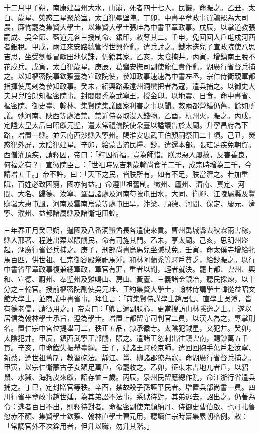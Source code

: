 \begin{pinyinscope}
 十二月甲子朔，南康建昌州大水，山崩，死者四十七人，民饑，命賑之。乙丑，太白、歲星、熒惑三星聚於室，太白犯壘壁陣。丁卯，中書平章政事買驢罷為大司農，廉恂罷為集賢大學士，以集賢大學士張珪為中書平章政事。戊辰，以掌道教張嗣成、吳全節、藍道元各三授制命、銀印，敕奪其二。壬申，免回回人戶屯戍河西者銀稅。甲戌，兩江來安路總管岑世興作亂，遣兵討之。鐵木迭兒子宣政院使八思吉思，坐受劉夔冒獻田地伏誅，仍籍其家。乙亥，太陰掩井。丙寅，增鎮南王脫不花戍兵。戊寅，太白犯歲星。庚辰，葛蠻安撫司副使龍仁貴作亂，湖廣行省督兵捕之。以知樞密院事欽察臺為宣政院使，參知政事速速為中書左丞，宗仁侍衛親軍都指揮使馬剌為參知政事。癸未，紹興路柔遠州洞蠻把者為寇，遣兵捕之。以御史大夫只兒哈郎知樞密院事。封闍闍禿為武寧王，授金印。以地震、日食，命中書省、樞密院、御史臺、翰林、集賢院集議國家利害之事以聞。敕兩都營繕仍舊，餘如所議。弛河南、陜西等處酒禁。禁近侍奏取沒入錢物。乙酉，杭州火，賑之。丙戌，定謚太皇太后曰昭獻元聖，遣太常禮儀院使朵臺以謚議告於太廟。升寧昌府為下路，增置一縣。並云南西沙縣入寧州。賜淮安忠武王伯顏祠祭田二十頃。己丑，熒惑犯外屏，太陰犯建星。辛卯，給蒙古流民糧、鈔，遣還本部。張珪足疾免朝賀。西僧灌頂疾，請釋囚，帝曰：「釋囚祈福，豈為師惜。朕思惡人屢赦，反害善良，何福之有？」宣徽院臣言：「世祖時晃吉剌歲輸尚食羊二千，成宗時增為三千，今請增五千。」帝不許，曰：「天下之民，皆朕所有，如有不足，朕當濟之。若加重賦，百姓必致困窮，國亦何益。」命遵世祖舊制。徽州、廬州、濟南、真定、河間、大名、歸德、汝寧、鞏昌諸處及河南芍陂屯田水，大同、衛輝、江陵屬縣及豐贍署大惠屯風，河南及雲南烏蒙等處屯田旱，汴梁、順德、河間、保定、慶元、濟寧、濮州、益都諸屬縣及諸衛屯田蝗。



 三年春正月癸巳朔，暹國及八番洞蠻酋長各遣使來貢。曹州禹城縣去秋霖雨害稼，縣人邢著、程進出粟以賑饑民，命有司旌其門。乙未，享太廟。己亥，思明州盜起，湖廣行省督兵捕之。庚子，刑部尚書烏馬兒坐贓杖免。壬寅，命太僕寺增給牝馬百匹，供世祖、仁宗御容殿祭祀馬湩。和林阿蘭禿等驛戶貧乏，給鈔賑之。以行中書省平章政事復兼總軍政，軍官有罪，重者以聞，輕者就決。罷上都、雲州、興和、宣德、蔚州、奉聖州及雞鳴山、房山、黃蘆、三義諸金銀冶，聽民採煉，以十分之三輸官。授前樞密院副使吳元珪、王約集賢大學士，翰林侍講學士韓從益昭文館大學士，並商議中書省事。拜住言：「前集賢侍講學士趙居信、直學士吳澄，皆有德老儒，請徵用之。」帝喜曰：「卿言適副朕心，更當搜訪山林隱逸之士。」遂以居信為翰林學士承旨，澄為學士。增置上都留守司判官二員，以漢人為之，專掌刑名。置仁宗中宮位提舉司二，秩正五品，隸承徽寺。太陰犯鉞星，又犯井。癸卯，太陰犯井。甲辰，鎮西武寧王部饑，賑之。遣諸王忽剌出往鎮雲南，賜鈔萬五千貫。辛亥，申命鐵失振舉臺綱。壬子，建諸王驛於京師，遣回回砲手萬戶赴汝寧、新蔡，遵世祖舊制，教習砲法。靜江、邕、柳諸郡獠為寇，命湖廣行省督兵捕之。甲寅，以宗仁衛蒙古子女額足萬戶，命罷收之。乙卯，征東末吉地兀者戶，以貂鼠、水獺、海狗皮來獻，詔存恤三歲。丙辰，泉州民留應總作亂，命江浙行省遣兵捕之。丁巳，定封贈官等秩。辛酉，禁故殺子孫誣平民者。增置兵部尚書一員。四川行省平章政事趙世延，為其弟訟不法事，系獄待對，其弟逃去，詔出之。仍著為令：逃者百日不出，則釋待對者。命樞密副使完顏納丹、侍御史曹伯啟、也可扎魯忽赤不顏、集賢學士欽察、翰林直學士曹元用，聽讀仁宗時纂集累朝格例。敕：「常調官外不次銓用者，但升以職，勿升其階。」




\end{pinyinscope}
